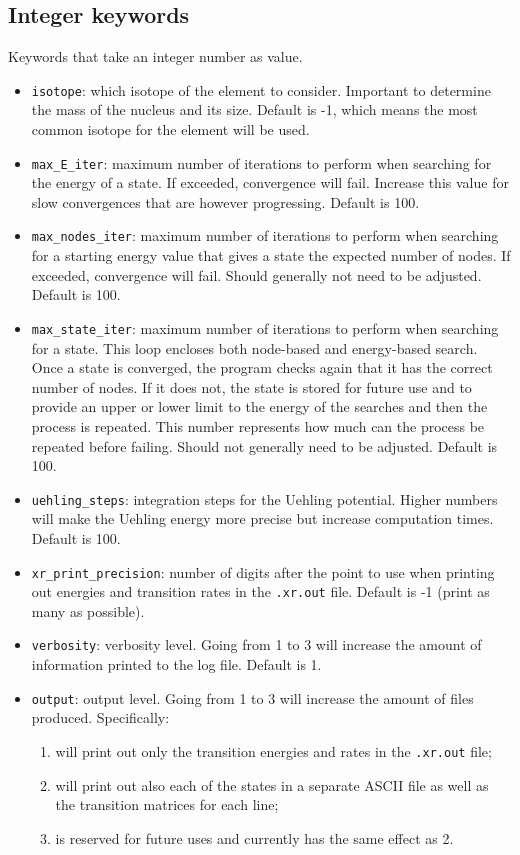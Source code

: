 \documentclass[]{article}
\begin{document}
\subsection{Integer keywords}

Keywords that take an integer number as value.

\begin{itemize}
	\item \texttt{isotope}: which isotope of the element to consider. Important to determine the mass of the nucleus and its size. Default is -1, which means the most common isotope for the element will be used.
	\item \texttt{max\_E\_iter}: maximum number of iterations to perform when searching for the energy of a state. If exceeded, convergence will fail. Increase this value for slow convergences that are however progressing. Default is 100.
	\item \texttt{max\_nodes\_iter}: maximum number of iterations to perform when searching for a starting energy value that gives a state the expected number of nodes. If exceeded, convergence will fail. Should generally not need to be adjusted. Default is 100.
	\item \texttt{max\_state\_iter}: maximum number of iterations to perform when searching for a state. This loop encloses both node-based and energy-based search. Once a state is converged, the program checks again that it has the correct number of nodes. If it does not, the state is stored for future use and to provide an upper or lower limit to the energy of the searches and then the process is repeated. This number represents how much can the process be repeated before failing. Should not generally need to be adjusted. Default is 100.
	\item \texttt{uehling\_steps}: integration steps for the Uehling potential. Higher numbers will make the Uehling energy more precise but increase computation times. Default is 100.
	\item \texttt{xr\_print\_precision}: number of digits after the point to use when printing out energies and transition rates in the \texttt{.xr.out} file. Default is -1 (print as many as possible).
	\item \texttt{verbosity}: verbosity level. Going from 1 to 3 will increase the amount of information printed to the log file. Default is 1.
	\item \texttt{output}: output level. Going from 1 to 3 will increase the amount of files produced. Specifically:
	\begin{enumerate}
		\item will print out only the transition energies and rates in the \texttt{.xr.out} file;
		\item will print out also each of the states in a separate ASCII file as well as the transition matrices for each line;
		\item is reserved for future uses and currently has the same effect as 2.
	\end{enumerate}
\end{itemize}
\end{document}

